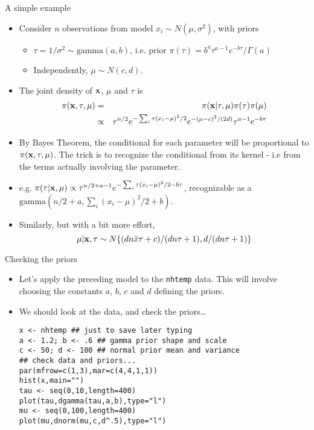 \documentclass{beamer}
\newcommand{\eps}[3]
{{\begin{center}
 \rotatebox{#1}{\scalebox{#2}{\texttt{[image: \#3]}}}
 \end{center}}
}
\begin{document}
\begin{frame}{A simple example}
\begin{itemize}
\item Consider $n$ observations from model $x_i \sim N(\mu, \sigma^2)$, with priors
\begin{itemize}
\item $\tau = 1/\sigma^2 \sim \text{gamma}(a,b)$, i.e. prior $\pi(\tau) = b^a \tau^{a-1} e^{-b\tau}/\Gamma(a)$ 
\item Independently, $\mu \sim N(c,d)$.\end{itemize}
\item The joint density of $\bf x$, $\mu$ and $\tau$ is
\begin{eqnarray*}
\pi({\bf x},\tau,\mu) &=& \pi({\bf x}|\tau,\mu)\pi(\tau)\pi(\mu) \\&\propto& \tau^{n/2} e^{-\sum_i \tau(x_i-\mu)^2/2} e^{-(\mu-c)^2/(2d)} \tau^{a-1} e^{-b\tau}
\end{eqnarray*}
\item By Bayes Theorem, the conditional for each parameter will be proportional to $\pi({\bf x},\tau,\mu)$. The trick is to recognize the conditional from its kernel - i.e from the terms actually involving the parameter.
\item e.g. $ \pi(\tau|{\bf x},\mu) \propto \tau^{n/2+a-1}e^{-\sum_i \tau(x_i-\mu)^2/2 - b\tau} $,  recognizable as a $\text{gamma}(n/2+a,\sum_i (x_i-\mu)^2/2 + b)$.
\item Similarly, but with a bit more effort, $$
\mu|{\bf x},\tau \sim N\{(dn\bar x\tau + c)/(dn\tau + 1), d/(dn\tau+1)\}
$$
\end{itemize} 

\end{frame}

\begin{frame}[fragile]{Checking the priors}
\begin{itemize}
\item Let's apply the preceding model to the {\tt nhtemp} data. This will involve choosing the constants $a$, $b$, $c$ and $d$ defining the priors.
\item We should look at the data, and check the priors\ldots
{\scriptsize \begin{verbatim}
x <- nhtemp ## just to save later typing
a <- 1.2; b <- .6 ## gamma prior shape and scale
c <- 50; d <- 100 ## normal prior mean and variance
## check data and priors...
par(mfrow=c(1,3),mar=c(4,4,1,1))
hist(x,main="")
tau <- seq(0,10,length=400)
plot(tau,dgamma(tau,a,b),type="l")
mu <- seq(0,100,length=400)
plot(mu,dnorm(mu,c,d^.5),type="l")
\end{verbatim}}
\end{itemize}
\vspace*{-.5cm}
\eps{-90}{.4}{check-prior.eps}
\end{frame}
\end{document}
